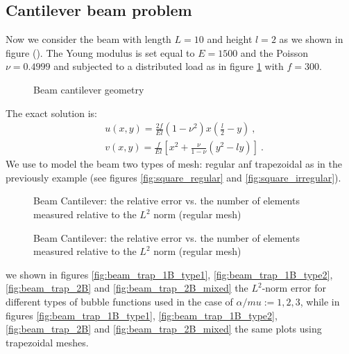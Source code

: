 \documentclass[a4paper,11pt]{article}
\begin{document}
\subsection{Cantilever beam problem}
Now we consider the beam with length $L=10$ and height $l=2$ as we shown in figure (). The Young modulus is set equal to $E=1500$ and the Poisson $\nu=0.4999$ and subjected to a distributed load as in figure \ref{fig:beam_geometry} with $f=300$.
%
\begin{figure}[h!]
\begin{center}

\caption{Beam cantilever geometry \label{fig:beam_geometry}}
\end{center}
\end{figure}
%
The exact solution is:
\begin{equation}
\begin{split}
&u(x,y) = \frac{2 f}{E l} (1-\nu^{2}) x \left( \frac{l}{2} - y \right)\: , \\
&v(x,y) = \frac{f}{E l} \left[ x^{2} + \frac{\nu}{1-\nu}\left(y^{2}-l y 
\right) \right] \: .
\end{split}
\end{equation}
We use to model the beam two types of mesh: regular anf trapezoidal as in the previously example (see figures \ref{fig:square_regular} and \ref{fig:square_irregular}).
%
\begin{figure}[h!]
\begin{center}
\caption{Beam Cantilever: the relative error vs. the number of elements measured relative to the $L^{2}$ norm (regular mesh)}
\end{center}
\end{figure}
%
\begin{figure}[h!]
\begin{center}
\caption{Beam Cantilever: the relative error vs. the number of elements measured relative to the $L^{2}$ norm (regular mesh)} 
\end{center}
\end{figure}
we shown in figures \ref{fig:beam_trap_1B_type1}, \ref{fig:beam_trap_1B_type2}, \ref{fig:beam_trap_2B} and \ref{fig:beam_trap_2B_mixed} the $L^{2}$-norm error for different types of bubble functions used in the case of $\alpha/mu:={1,2,3}$, while in figures \ref{fig:beam_trap_1B_type1}, \ref{fig:beam_trap_1B_type2}, \ref{fig:beam_trap_2B} and \ref{fig:beam_trap_2B_mixed} the same plots using trapezoidal meshes.
\end{document}
